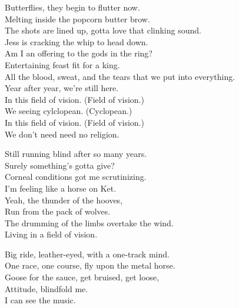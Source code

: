


Butterflies, they begin to flutter now. \\
Melting inside the popcorn butter brow. \\
The shots are lined up, gotta love that clinking sound. \\
Jess is cracking the whip to head down. \\

Am I an offering to the gods in the ring? \\
Entertaining feast fit for a king. \\
All the blood, sweat, and the tears that we put into everything. \\
Year after year, we're still here. \\

In this field of vision. (Field of vision.) \\
We seeing cylclopean. (Cyclopean.) \\
In this field of vision. (Field of vision.) \\
We don't need need no religion. \\


Still running blind after so many years. \\
Surely something's gotta give? \\
Corneal conditions got me scrutinizing. \\
I'm feeling like a horse on Ket. \\

Yeah, the thunder of the hooves, \\
Run from the pack of wolves. \\
The drumming of the limbs overtake the wind. \\
Living in a field of vision. \\


Big ride, leather-eyed, with a one-track mind. \\
One race, one course, fly upon the metal horse. \\
Goose for the sauce, get bruised, get loose, \\
Attitude, blindfold me. \\
I can see the music. \\

